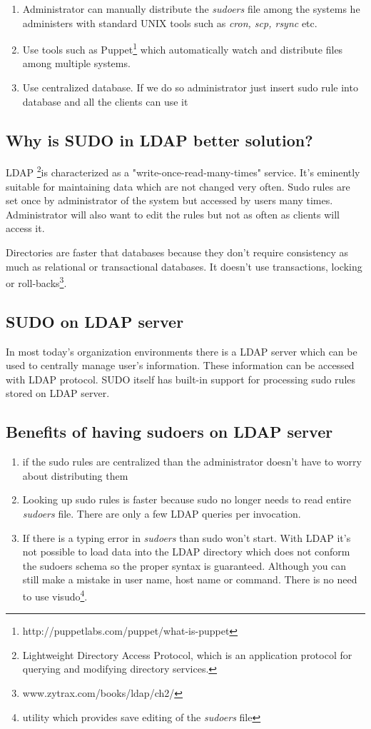 \documentclass[12pt,a4paper,titlepage,final]{article}
\begin{document}
\begin{enumerate} 
	\item Administrator can manually distribute the \emph{sudoers} file among the
		systems he administers with standard UNIX tools such as \emph{cron, scp,
		rsync} etc.
	\item Use tools such as
		Puppet\footnote{http://puppetlabs.com/puppet/what-is-puppet} which
		automatically watch and distribute files among multiple systems.
	\item Use centralized database. If we do so administrator just insert sudo
		rule into database and all the clients can use it
\end{enumerate}

\subsection{Why is SUDO in LDAP better solution?}
LDAP \footnote{Lightweight Directory Access Protocol, which is an application
protocol for querying and modifying directory services.}is characterized as a
"write-once-read-many-times" service. It's eminently suitable for maintaining
data which are not changed very often. Sudo rules are set once by administrator
of the system but accessed by users many times.  Administrator will also want to
edit the rules but not as often as clients will access it.

Directories are faster that databases because they don't require consistency as
much as relational or transactional databases. It doesn't use transactions,
locking or roll-backs\footnote{www.zytrax.com/books/ldap/ch2/}.


\subsection{SUDO on LDAP server}
In most today's organization environments there is a LDAP server which can be
used to centrally manage user's information. These information can be accessed
with LDAP protocol. SUDO itself has built-in support for processing sudo rules
stored on LDAP server.


\subsection{Benefits of having sudoers on LDAP server}
\begin{enumerate} 
	\item if the sudo rules are centralized than the administrator doesn't have to
		worry about distributing them
	\item Looking up sudo rules is faster because sudo no longer needs to read
		entire \emph{sudoers} file. There are only a few LDAP queries per
		invocation.
	\item If there is a typing error in \emph{sudoers} than sudo won't start. With
		LDAP it's not possible to load data into the LDAP directory which does not
		conform the sudoers schema so the proper syntax is guaranteed. Although you
		can still make a mistake in user name, host name or command. There is no
		need to use visudo\footnote{utility which provides save editing of the
		\emph{sudoers} file}.
\end{enumerate}
\end{document}
